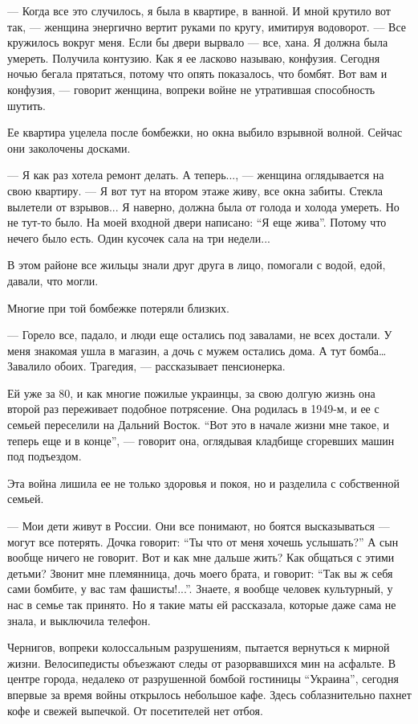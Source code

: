 — Когда все это случилось, я была в квартире, в ванной. И мной крутило вот так,
— женщина энергично вертит руками по кругу, имитируя водоворот. — Все кружилось
вокруг меня. Если бы двери вырвало — все, хана. Я должна была умереть. Получила
контузию. Как я ее ласково называю, конфузия. Сегодня ночью бегала прятаться,
потому что опять показалось, что бомбят. Вот вам и конфузия, — говорит женщина,
вопреки войне не утратившая способность шутить. 

Ее квартира уцелела после бомбежки, но окна выбило взрывной волной. Сейчас они
заколочены досками. 

— Я как раз хотела ремонт делать. А теперь..., — женщина оглядывается на свою
квартиру. — Я вот тут на втором этаже живу, все окна забиты. Стекла вылетели от
взрывов... Я наверно, должна была от голода и холода умереть. Но не тут-то было.
На моей входной двери написано: \enquote{Я еще жива}. Потому что нечего было есть. Один
кусочек сала на три недели... 

В этом районе все жильцы знали друг друга в лицо, помогали с водой, едой,
давали, что могли.

Многие при той бомбежке потеряли близких.

— Горело все, падало, и люди еще остались под завалами, не всех достали. У меня
знакомая ушла в магазин, а дочь с мужем остались дома. А тут бомба… Завалило
обоих. Трагедия, — рассказывает пенсионерка. 

Ей уже за 80, и как многие пожилые украинцы, за свою долгую жизнь она второй
раз переживает подобное потрясение. Она родилась в 1949-м, и ее с семьей
переселили на Дальний Восток. \enquote{Вот это в начале жизни мне такое, и теперь еще и
в конце}, — говорит она, оглядывая кладбище сгоревших машин под подъездом.

Эта война лишила ее не только здоровья и покоя, но и разделила с собственной
семьей. 

— Мои дети живут в России. Они все понимают, но боятся высказываться — могут
все потерять. Дочка говорит: \enquote{Ты что от меня хочешь услышать?} А сын вообще
ничего не говорит. Вот и как мне дальше жить? Как общаться с этими детьми?
Звонит мне племянница, дочь моего брата, и говорит: \enquote{Так вы ж себя сами
бомбите, у вас там фашисты!...}. Знаете, я вообще человек культурный, у нас в
семье так принято. Но я такие маты ей рассказала, которые даже сама не знала, и
выключила телефон.

Чернигов, вопреки колоссальным разрушениям, пытается вернуться к мирной жизни.
Велосипедисты объезжают следы от разорвавшихся мин на асфальте. В центре
города, недалеко от разрушенной бомбой гостиницы \enquote{Украина}, сегодня
впервые за время войны открылось небольшое кафе. Здесь соблазнительно пахнет
кофе и свежей выпечкой. От посетителей нет отбоя. 

